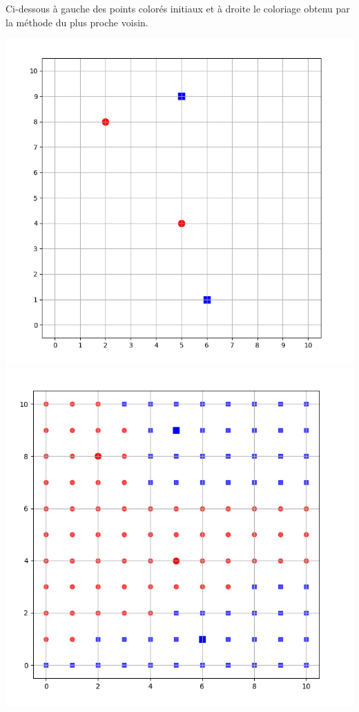 \documentclass[11pt,class=report,crop=false]{standalone}
\begin{document}
\begin{activite}
\begin{enumerate}
	Ci-dessous à gauche des points colorés initiaux et à droite le coloriage obtenu par la méthode du plus proche voisin. 
	\begin{center}
	\includegraphics[scale=\myscale,scale=0.25]{ecran-voisins-4} \quad
	\includegraphics[scale=\myscale,scale=0.25]{ecran-voisins-5}
	\end{center}


\end{enumerate}
\end{activite}
\end{document}
